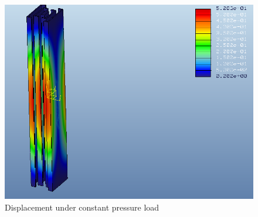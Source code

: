 \documentclass[12pt,letterpaper]{report}
\begin{document}
		\begin{figure}[H]
			\centering
			\includegraphics[width=.75\textwidth]{PressAssyDisp}
			\caption{Displacement under constant pressure load}
			\label{fig:ConstPressDisp}
		\end{figure}
		
		\graphicspath{ {..} }
		
\end{document}
